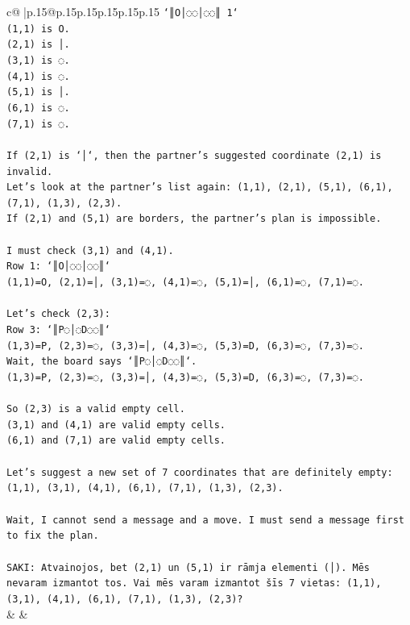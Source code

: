\documentclass{article}
\begin{document}
{\begin{supertabular}{c@{$\;$}|p{.15\linewidth}@{}p{.15\linewidth}p{.15\linewidth}p{.15\linewidth}p{.15\linewidth}p{.15\linewidth}}
{{{\texttt{`║O│◌◌│◌◌║ 1`} \\
\texttt{(1,1) is O.} \\
\texttt{(2,1) is │.} \\
\texttt{(3,1) is ◌.} \\
\texttt{(4,1) is ◌.} \\
\texttt{(5,1) is │.} \\
\texttt{(6,1) is ◌.} \\
\texttt{(7,1) is ◌.} \\
\\ 
\texttt{If (2,1) is `│`, then the partner's suggested coordinate (2,1) is invalid.} \\
\texttt{Let's look at the partner's list again: (1,1), (2,1), (5,1), (6,1), (7,1), (1,3), (2,3).} \\
\texttt{If (2,1) and (5,1) are borders, the partner's plan is impossible.} \\
\\ 
\texttt{I must check (3,1) and (4,1).} \\
\texttt{Row 1: `║O│◌◌│◌◌║`} \\
\texttt{(1,1)=O, (2,1)=│, (3,1)=◌, (4,1)=◌, (5,1)=│, (6,1)=◌, (7,1)=◌.} \\
\\ 
\texttt{Let's check (2,3):} \\
\texttt{Row 3: `║P◌│◌D◌◌║`} \\
\texttt{(1,3)=P, (2,3)=◌, (3,3)=│, (4,3)=◌, (5,3)=D, (6,3)=◌, (7,3)=◌.} \\
\texttt{Wait, the board says `║P◌│◌D◌◌║`.} \\
\texttt{(1,3)=P, (2,3)=◌, (3,3)=│, (4,3)=◌, (5,3)=D, (6,3)=◌, (7,3)=◌.} \\
\\ 
\texttt{So (2,3) is a valid empty cell.} \\
\texttt{(3,1) and (4,1) are valid empty cells.} \\
\texttt{(6,1) and (7,1) are valid empty cells.} \\
\\ 
\texttt{Let's suggest a new set of 7 coordinates that are definitely empty:} \\
\texttt{(1,1), (3,1), (4,1), (6,1), (7,1), (1,3), (2,3).} \\
\\ 
\texttt{Wait, I cannot send a message and a move. I must send a message first to fix the plan.} \\
\\ 
\texttt{SAKI: Atvainojos, bet (2,1) un (5,1) ir rāmja elementi (│). Mēs nevaram izmantot tos. Vai mēs varam izmantot šīs 7 vietas: (1,1), (3,1), (4,1), (6,1), (7,1), (1,3), (2,3)?} \\
            }
        }
    }
    & & \\ \\


\end{supertabular}}
\end{document}
